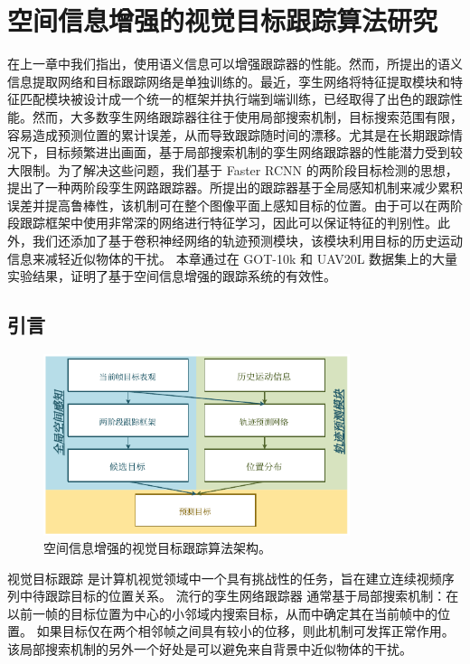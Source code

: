 \chapter{空间信息增强的视觉目标跟踪算法研究}\label{chap:globally}
在上一章中我们指出，使用语义信息可以增强跟踪器的性能。然而，所提出的语义信息提取网络和目标跟踪网络是单独训练的。最近，孪生网络将特征提取模块和特征匹配模块被设计成一个统一的框架并执行端到端训练，已经取得了出色的跟踪性能。然而，大多数孪生网络跟踪器往往于使用局部搜索机制，目标搜索范围有限，容易造成预测位置的累计误差，从而导致跟踪随时间的漂移。尤其是在长期跟踪情况下，目标频繁进出画面，基于局部搜索机制的孪生网络跟踪器的性能潜力受到较大限制。为了解决这些问题，我们基于 Faster RCNN \cite{ren2015faster} 的两阶段目标检测的思想，提出了一种两阶段孪生网路跟踪器。所提出的跟踪器基于全局感知机制来减少累积误差并提高鲁棒性，该机制可在整个图像平面上感知目标的位置。由于可以在两阶段跟踪框架中使用非常深的网络进行特征学习，因此可以保证特征的判别性。此外，我们还添加了基于卷积神经网络的轨迹预测模块，该模块利用目标的历史运动信息来减轻近似物体的干扰。
本章通过在 GOT-10k \cite{GOT-10k} 和 UAV20L \cite{mueller2016benchmark} 数据集上的大量实验结果，证明了基于空间信息增强的跟踪系统的有效性。

\section{引言}

\begin{figure}[t]
	\centering
    \includegraphics[width=0.8\textwidth]{Img/globally/Arch7.pdf}
    \caption{空间信息增强的视觉目标跟踪算法架构。}
\end{figure}

视觉目标跟踪 \cite{Leang2018OnlineFO, Wang2019VisualOT, Zhang2018UsingFL} 是计算机视觉领域中一个具有挑战性的任务，旨在建立连续视频序列中待跟踪目标的位置关系。
流行的孪生网络跟踪器 \cite{SiamFC, SiamRPN, Wang2018SiamMask} 通常基于局部搜索机制：在以前一帧的目标位置为中心的小邻域内搜索目标，从而中确定其在当前帧中的位置。
如果目标仅在两个相邻帧之间具有较小的位移，则此机制可发挥正常作用。该局部搜索机制的另外一个好处是可以避免来自背景中近似物体的干扰。


